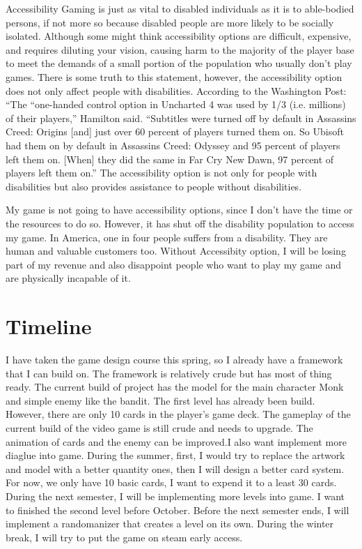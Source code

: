 \documentclass[10pt,twocolumn]{article}
\begin{document}
Accessibility 
Gaming is just as vital to disabled individuals as it is to able-bodied persons, if not more so because disabled people are more likely to be socially isolated. 
Although some might think accessibility options are difficult, expensive, and requires diluting your vision, causing harm to the majority of the player base to meet the demands of a small portion of the population who usually don't play games. There is some truth to this statement, however, the accessibility option does not only affect people with disabilities. According to the Washington Post: “The “one-handed control option in Uncharted 4 was used by 1/3 (i.e. millions) of their players,” Hamilton said. “Subtitles were turned off by default in Assassins Creed: Origins [and] just over 60 percent of players turned them on. So Ubisoft had them on by default in Assassins Creed: Odyssey and 95 percent of players left them on. [When] they did the same in Far Cry New Dawn, 97 percent of players left them on.”  The accessibility option is not only for people with disabilities but also provides assistance to people without disabilities. 

My game is not going to have accessibility options, since I don't have the time or the resources to do so. However, it has shut off the disability population to access my game. In America, one in four people suffers from a disability.  They are human and valuable customers too. Without Accessibity option, I will be losing part of my revenue and also disappoint people who want to play my game and are physically incapable of it.    



\section{Timeline}
I have taken the game design course this spring, so I already have a framework that I can build on. The framework is relatively crude but has most of thing ready. The current build of project has the model for the main character Monk and simple enemy like the bandit. The first level has already been build. However, there are only 10 cards in the player’s game deck. The gameplay of the current build of the video game is still crude and needs to upgrade. The animation of cards and the enemy can be improved.I also want implement more diaglue into game. During the summer, first, I would try to replace the artwork and model with a better quantity ones, then I will design a better card system. For now, we only have 10 basic cards, I want to expend it to a least 30 cards. During the next semester, I will be implementing more levels into game. I want to finished the second level before October. Before the next semester ends, I will implement a randomanizer that creates a level on its own. During the winter break, I will try to put the game on steam early access. 
\end{document}
